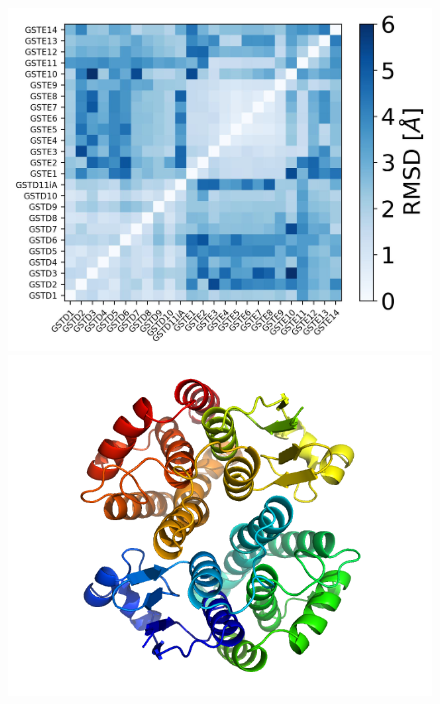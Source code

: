 \begin{figure}[h!]
\begin{minipage}{.32\linewidth}
		\includegraphics[width = .99\textwidth]{figures/fig3-1-2}
	\end{minipage}
	\begin{minipage}{.32\linewidth}
		\includegraphics[width = .99\textwidth]{figures/fig3-1-3} %
	\end{minipage}
	\begin{minipage}{.32\linewidth}

\end{minipage}
\end{figure}
